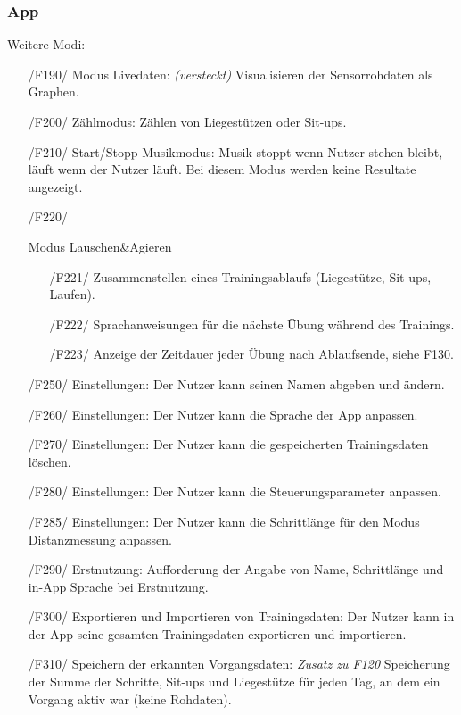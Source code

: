 \documentclass[a4paper,12pt]{article}
\begin{document}
    \subsubsection{App}
      Weitere Modi:
      \begin{itemize}
      \item[/F190/] \textsf{Modus Livedaten: \textit{(versteckt)}} Visualisieren der Sensorrohdaten als Graphen.
      \item[/F200/] \textsf{Zählmodus:} Zählen von Liegestützen oder Sit-ups.
      \item[/F210/] \textsf{Start/Stopp Musikmodus:} Musik stoppt wenn Nutzer stehen bleibt, läuft wenn der Nutzer läuft. Bei diesem Modus werden keine Resultate angezeigt.
      \item[/F220/]{
        Modus \glqq Lauschen\&Agieren\grqq
        \begin{itemize}
          \item[/F221/] Zusammenstellen eines Trainingsablaufs (Liegestütze, Sit-ups, Laufen). 
          \item[/F222/] Sprachanweisungen für die nächste Übung während des Trainings.
          \item[/F223/] Anzeige der Zeitdauer jeder Übung nach Ablaufsende, siehe F130.
        \end{itemize}
      }
      \item[/F250/] \textsf {Einstellungen:} Der Nutzer kann seinen Namen abgeben und ändern.
      \item[/F260/] \textsf {Einstellungen:} Der Nutzer kann die Sprache der App anpassen.
      \item[/F270/] \textsf {Einstellungen:} Der Nutzer kann die gespeicherten Trainingsdaten löschen.
      \item[/F280/] \textsf {Einstellungen:} Der Nutzer kann die Steuerungsparameter anpassen. 
      \item[/F285/] \textsf {Einstellungen:} Der Nutzer kann die Schrittlänge für den Modus Distanzmessung anpassen.
      \item[/F290/] \textsf {Erstnutzung:} Aufforderung der Angabe von Name, Schrittlänge und in-App Sprache bei Erstnutzung.
      \item[/F300/] \textsf{Exportieren und Importieren von Trainingsdaten:} Der Nutzer kann in der App seine gesamten Trainingsdaten exportieren und importieren.
      \item[/F310/] \textsf{Speichern der erkannten Vorgangsdaten: \textit{Zusatz zu F120}} Speicherung der Summe der Schritte, Sit-ups und Liegestütze für jeden Tag, an dem ein Vorgang aktiv war (keine Rohdaten).
      \end{itemize}
\end{document}
